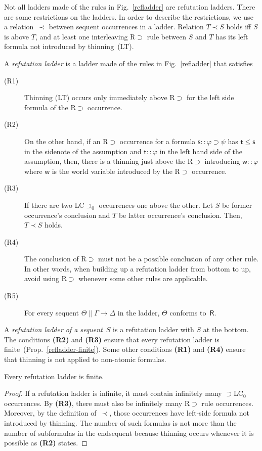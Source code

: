  Not all ladders made of the rules in Fig.~\ref{refladder} are
 refutation ladders.
 There are some restrictions on the ladders.
 In order to describe the restrictions,
 we use a relation~$\prec$ between sequent occurrences in a ladder.
Relation $T\prec S$ holds iff
 $S$ is above $T$, and
 at least one interleaving \textrm{R$\supset$} rule between $S$ and $T$
 has its left formula not introduced by thinning~(LT).
\begin{definition}
 A \textit{refutation ladder} is a ladder made of the rules in
 Fig.~\ref{refladder} that satisfies
\begin{description}
 \item[ (R1)] Thinning \textrm{(LT)} occurs only immediately above \textrm{R$\supset$} for the
	    left side formula of the \textrm{R$\supset$} occurrence.
 \item[ (R2)] 
	    On the other hand, if an \textrm{R$\supset$} occurrence
	    for a formula
	    $\mathsf s::\varphi\supset\psi$ has $\mathsf t\le \mathsf s$
	    in the sidenote of the assumption and
	    $\mathsf t::\varphi$ in the left hand side of the assumption,
	    then, 
	    there is a thinning just above the R$\supset$ introducing
	    $\mathsf w::\varphi$ where $\mathsf w$ is the world variable
	    introduced by the \textrm{R$\supset$} occurrence.
 \item[ (R3)]
	    If there are two \textrm{LC$\supset_0$} occurrences one above the
	    other.
	    Let $S$ be former occurrence's conclusion and $T$ be latter occurrence's
	    conclusion.
	    Then, $T\prec S$ holds.
 \item[ (R4)]
	    The conclusion of \textrm{R$\supset$} must not be a
	    possible conclusion of any other rule.
	    In other words, when building up a refutation ladder from
	    bottom to up, avoid using R$\supset$ whenever some other
	    rules are applicable.
 \item[ (R5)]
	    For every sequent $\Theta\parallel \Gamma\rightarrow\Delta$
	    in the ladder, $\Theta$ conforms to~$\mathsf R$.
\end{description} 
\end{definition}
A \textit{refutation ladder of a sequent}~$S$ is a refutation ladder
 with
 $S$ at the bottom.
The conditions \textbf{(R2)} and \textbf{(R3)} ensure that every
 refutation ladder is finite~(Prop.~\ref{refladder-finite}).
 Some other conditions \textbf{(R1)} and \textbf{(R4)} ensure
 that thinning is not applied to non-atomic formulas.


\begin{proposition}
\label{refladder-finite}
 Every refutation ladder is finite.
\end{proposition}
\begin{proof}
 If a refutation ladder is infinite,
 it must contain infinitely many $\supset$LC$_0$ occurrences.
 By \textbf{(R3)}, there must also be infinitely many R$\supset$ rule
 occurrences.
 Moreover, by the definition of~$\prec$,
 those occurrences have left-side formula not
 introduced by thinning.
 The number of such formulas is not more than the number of subformulas
 in the endsequent because thinning occurs whenever it is possible as
 \textbf{(R2)} states.
\end{proof}

